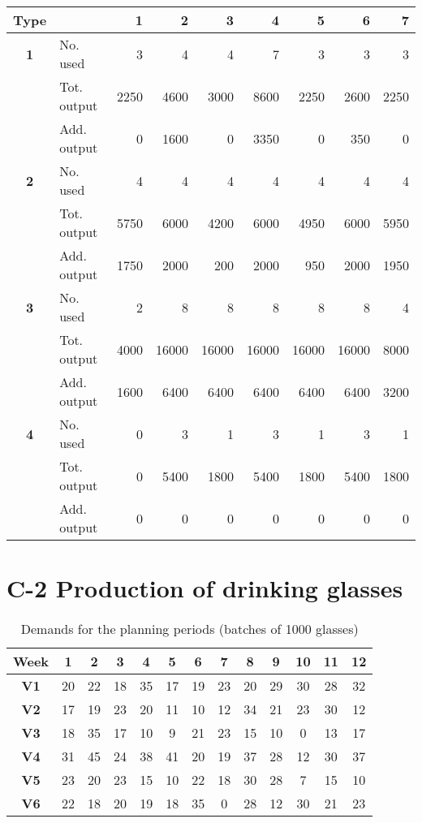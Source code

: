 \documentclass[11pt,oneside]{article}
\begin{document}
\begin{table}[h]
    \center
\begin{tabular}{clrrrrrrr}
    \hline
    \textbf{Type} & & \textbf{1} & \textbf{2} & \textbf{3} & \textbf{4} & \textbf{5} & \textbf{6} & \textbf{7} \\
\hline
    \textbf{1} & No. used & 3 & 4 & 4 & 7 & 3 & 3 & 3\\
 & Tot. output & 2250 & 4600 & 3000 & 8600 & 2250 & 2600 & 2250\\
 & Add. output & 0 & 1600 & 0 & 3350 & 0 & 350 & 0\\
 \hline
    \textbf{2} & No. used & 4 & 4 & 4 & 4 & 4 & 4 & 4\\
 & Tot. output & 5750 & 6000 & 4200 & 6000 & 4950 & 6000 & 5950\\
 & Add. output & 1750 & 2000 & 200 & 2000 & 950 & 2000 & 1950\\
 \hline
    \textbf{3} & No. used & 2 & 8 & 8 & 8 & 8 & 8 & 4\\
 & Tot. output & 4000 & 16000 & 16000 & 16000 & 16000 & 16000 & 8000\\
 & Add. output & 1600 & 6400 & 6400 & 6400 & 6400 & 6400 & 3200\\
 \hline
    \textbf{4} & No. used & 0 & 3 & 1 & 3 & 1 & 3 & 1\\
 & Tot. output & 0 & 5400 & 1800 & 5400 & 1800 & 5400 & 1800\\
 & Add. output & 0 & 0 & 0 & 0 & 0 & 0 & 0\\
 \hline
\end{tabular}
\end{table}

\section{C-2 Production of drinking glasses}

\begin{table}[h]
    \center
    \caption{Demands for the planning periods (batches of 1000 glasses)}
    \begin{tabular}{ccccccccccccc}
        \hline
        \textbf{Week} & \textbf{1} & \textbf{2} & \textbf{3} & \textbf{4} & \textbf{5} & \textbf{6} & \textbf{7} & \textbf{8} & \textbf{9} & \textbf{10} & \textbf{11} & \textbf{12} \\
        \hline
        \textbf{V1} & 20 & 22 & 18 & 35 & 17 & 19 & 23 & 20 & 29 & 30 & 28 & 32 \\
        \textbf{V2} & 17 & 19 & 23 & 20 & 11 & 10 & 12 & 34 & 21 & 23 & 30 & 12 \\
        \textbf{V3} & 18 & 35 & 17 & 10 & 9  & 21 & 23 & 15 & 10 & 0  & 13 & 17 \\
        \textbf{V4} & 31 & 45 & 24 & 38 & 41 & 20 & 19 & 37 & 28 & 12 & 30 & 37 \\
        \textbf{V5} & 23 & 20 & 23 & 15 & 10 & 22 & 18 & 30 & 28 & 7 & 15 & 10 \\
        \textbf{V6} & 22 & 18 & 20 & 19 & 18 & 35 & 0  & 28 & 12 & 30 & 21 & 23 \\
        \hline
    \end{tabular}
\end{table}
\end{document}
